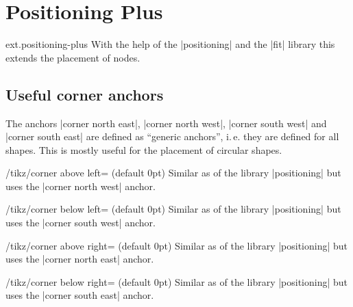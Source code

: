 %
%
%
\clearpage
\section{Positioning Plus}
\label{library:positioning-plus}
\begin{tikzlibrary}{ext.positioning-plus}
  With the help of the |positioning| and the |fit| library this extends the placement of nodes.
\end{tikzlibrary}

\subsection{Useful corner anchors}
The anchors |corner north east|, |corner north west|, |corner south west| and |corner south east|
are defined as ``generic anchors'', i.\,e. they are defined for all shapes.
This is mostly useful for the placement of circular shapes.
\begin{stylekey}{/tikz/corner above left= (default 0pt)}
  Similar as  of the \tikzname\space library |positioning|
  but uses the |corner north west| anchor.
\end{stylekey}
\begin{stylekey}{/tikz/corner below left= (default 0pt)}
  Similar as  of the \tikzname\space library |positioning|
  but uses the |corner south west| anchor.
\end{stylekey}
\begin{stylekey}{/tikz/corner above right= (default 0pt)}
  Similar as  of the \tikzname\space library |positioning|
  but uses the |corner north east| anchor.
\end{stylekey}
\begin{stylekey}{/tikz/corner below right= (default 0pt)}
  Similar as  of the \tikzname\space library |positioning|
  but uses the |corner south east| anchor.
\end{stylekey}

